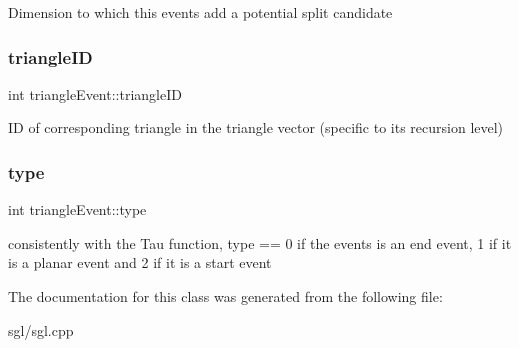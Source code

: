 Dimension to which this events add a potential split candidate \mbox{\label{classtriangle_event_ae36abd7d179b513bed4caff1a85d9730}} 
\subsubsection{\texorpdfstring{triangle\+ID}{triangleID}}
{\footnotesize\ttfamily int triangle\+Event\+::triangle\+ID}

ID of corresponding triangle in the triangle vector (specific to it\textquotesingle{}s recursion level) \mbox{\label{classtriangle_event_a78388041677d097127500270b580826c}} 
\subsubsection{\texorpdfstring{type}{type}}
{\footnotesize\ttfamily int triangle\+Event\+::type}

consistently with the Tau function, type == 0 if the events is an end event, 1 if it is a planar event and 2 if it is a start event 

The documentation for this class was generated from the following file\+:\begin{DoxyCompactItemize}
\item 
sgl/sgl.\+cpp\end{DoxyCompactItemize}
